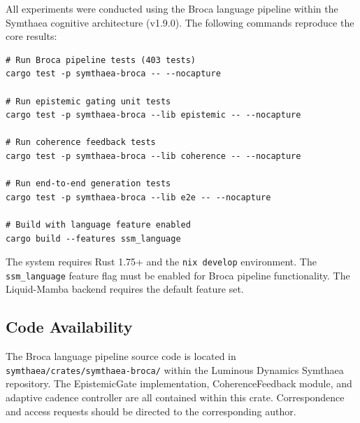 \documentclass[12pt,a4paper]{article}
\begin{document}
All experiments were conducted using the Broca language pipeline within the Symthaea cognitive architecture (v1.9.0). The following commands reproduce the core results:

\begin{verbatim}
# Run Broca pipeline tests (403 tests)
cargo test -p symthaea-broca -- --nocapture

# Run epistemic gating unit tests
cargo test -p symthaea-broca --lib epistemic -- --nocapture

# Run coherence feedback tests
cargo test -p symthaea-broca --lib coherence -- --nocapture

# Run end-to-end generation tests
cargo test -p symthaea-broca --lib e2e -- --nocapture

# Build with language feature enabled
cargo build --features ssm_language
\end{verbatim}

The system requires Rust 1.75+ and the \texttt{nix develop} environment. The \texttt{ssm\_language} feature flag must be enabled for Broca pipeline functionality. The Liquid-Mamba backend requires the default feature set.

\subsection*{Code Availability}

The Broca language pipeline source code is located in \texttt{symthaea/crates/symthaea-broca/} within the Luminous Dynamics Symthaea repository. The EpistemicGate implementation, CoherenceFeedback module, and adaptive cadence controller are all contained within this crate. Correspondence and access requests should be directed to the corresponding author.
\end{document}
